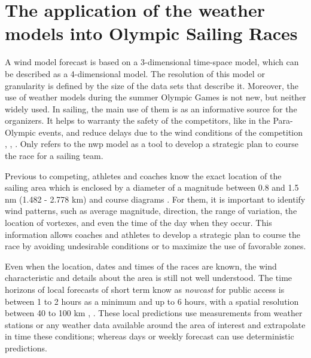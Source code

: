 \section{The application of the weather models into Olympic Sailing Races} \label{sec:WindModel_on_Olympics}

A wind model forecast is based on a 3-dimensional time-space model, which can be described as a 4-dimensional model. The resolution of this model or granularity is defined by the size of the data sets that describe it. Moreover, the use of weather models during the summer Olympic Games is not new, but neither widely used. In sailing, the main use of them is as an informative source for the organizers. It helps to warranty the safety of the competitors, like in the Para-Olympic events, and reduce delays due to the wind conditions of the competition  \cite{spark2004wind}, \cite{sheng2009structure}, \cite{golding2014forecasting}. Only \cite{giannaros2018ultrahigh} refers to the \acrshort{nwp} model as a tool to develop a strategic plan to course the race for a sailing team. \par 

Previous to competing, athletes and coaches know the exact location of the sailing area which is enclosed by a diameter of a magnitude between 0.8 and 1.5 nm (1.482 - 2.778 km) and course diagrams \cite{SailRaceRio}. For them, it is important to identify wind patterns, such as average magnitude, direction, the range of variation, the location of vortexes, and even the time of the day when they occur. This information allows coaches and athletes to develop a strategic plan to course the race by avoiding undesirable conditions or to maximize the use of favorable zones.\par

Even when the location, dates and times of the races are known, the wind characteristic and details about the area is still not well understood. The time horizons of local forecasts of short term know as \textit{nowcast} for public access is between 1 to 2 hours as a minimum and up to 6 hours, with a spatial resolution between 40 to 100 km \cite{warner2010numerical}, \cite{kristensen2010weather}. These local predictions use measurements from weather stations or any weather data available around the area of interest and extrapolate in time these conditions; whereas days or weekly forecast can use deterministic predictions.\par

